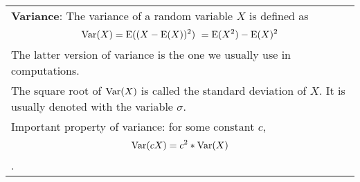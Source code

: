 {\tabulinesep=1mm
\begin{tabu}{|p{16cm} |}
\hline

\textbf{Variance}: The variance of a random variable $X$ is defined as $$\var(X) = \E((X - \E(X))^2)\ = \E(X^2) - \E(X)^2$$ The latter version of variance is the one we usually use in computations. \\
The square root of $\text{Var}(X)$ is called the standard deviation of $X$. It is usually denoted with the variable $\sigma$. \\
Important property of variance: for some constant $c$, \[\text{Var}(cX) = c^2 * \text{Var}(X)\].
\\
\hline
\end{tabu}

}
